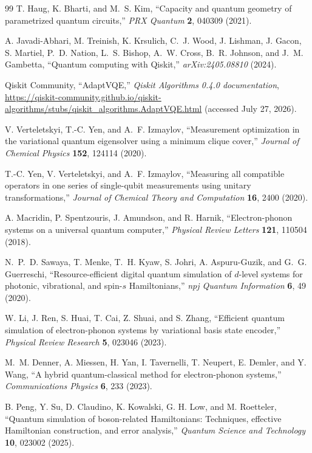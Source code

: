 \documentclass[
  reprint,
  amsmath,
  amssymb,
  aps,
  pra,
  nofootinbib,
  superscriptaddress,
  floatfix
]{revtex4-2}
\begin{document}
\begin{thebibliography}{99}
T. Haug, K. Bharti, and M.~S. Kim,
``Capacity and quantum geometry of parametrized quantum circuits,''
\emph{PRX Quantum} \textbf{2}, 040309 (2021).

A. Javadi-Abhari, M. Treinish, K. Krsulich, C.~J. Wood, J. Lishman, J. Gacon, S. Martiel, P.~D. Nation, L.~S. Bishop, A.~W. Cross, B.~R. Johnson, and J.~M. Gambetta,
``Quantum computing with Qiskit,''
\emph{arXiv:2405.08810} (2024).

Qiskit Community,
``AdaptVQE,''
\emph{Qiskit Algorithms 0.4.0 documentation},
\url{https://qiskit-community.github.io/qiskit-algorithms/stubs/qiskit_algorithms.AdaptVQE.html}
(accessed July 27, 2026).

V. Verteletskyi, T.-C. Yen, and A.~F. Izmaylov,
``Measurement optimization in the variational quantum eigensolver using a minimum clique cover,''
\emph{Journal of Chemical Physics} \textbf{152}, 124114 (2020).

T.-C. Yen, V. Verteletskyi, and A.~F. Izmaylov,
``Measuring all compatible operators in one series of single-qubit measurements using unitary transformations,''
\emph{Journal of Chemical Theory and Computation} \textbf{16}, 2400 (2020).


A. Macridin, P. Spentzouris, J. Amundson, and R. Harnik,
``Electron-phonon systems on a universal quantum computer,''
\emph{Physical Review Letters} \textbf{121}, 110504 (2018).

N.~P.~D. Sawaya, T. Menke, T.~H. Kyaw, S. Johri, A. Aspuru-Guzik, and G.~G. Guerreschi,
``Resource-efficient digital quantum simulation of $d$-level systems for photonic, vibrational, and spin-$s$ Hamiltonians,''
\emph{npj Quantum Information} \textbf{6}, 49 (2020).

W. Li, J. Ren, S. Huai, T. Cai, Z. Shuai, and S. Zhang,
``Efficient quantum simulation of electron-phonon systems by variational basis state encoder,''
\emph{Physical Review Research} \textbf{5}, 023046 (2023).

M.~M. Denner, A. Miessen, H. Yan, I. Tavernelli, T. Neupert, E. Demler, and Y. Wang,
``A hybrid quantum-classical method for electron-phonon systems,''
\emph{Communications Physics} \textbf{6}, 233 (2023).

B. Peng, Y. Su, D. Claudino, K. Kowalski, G. H. Low, and M. Roetteler,
``Quantum simulation of boson-related Hamiltonians: Techniques, effective Hamiltonian construction, and error analysis,''
\emph{Quantum Science and Technology} \textbf{10}, 023002 (2025).


\end{thebibliography}
\end{document}
